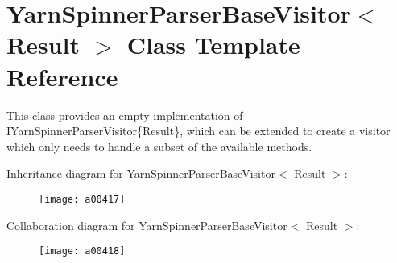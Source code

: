\hypertarget{a00199}{\section{Yarn\-Spinner\-Parser\-Base\-Visitor$<$ Result $>$ Class Template Reference}
\label{a00199}
}


This class provides an empty implementation of I\-Yarn\-Spinner\-Parser\-Visitor\{\-Result\}, which can be extended to create a visitor which only needs to handle a subset of the available methods.  




Inheritance diagram for Yarn\-Spinner\-Parser\-Base\-Visitor$<$ Result $>$\-:
\nopagebreak
\begin{figure}[H]
\begin{center}
\leavevmode
\texttt{[image: a00417]}
\end{center}
\end{figure}


Collaboration diagram for Yarn\-Spinner\-Parser\-Base\-Visitor$<$ Result $>$\-:
\nopagebreak
\begin{figure}[H]
\begin{center}
\leavevmode
\texttt{[image: a00418]}
\end{center}
\end{figure}
